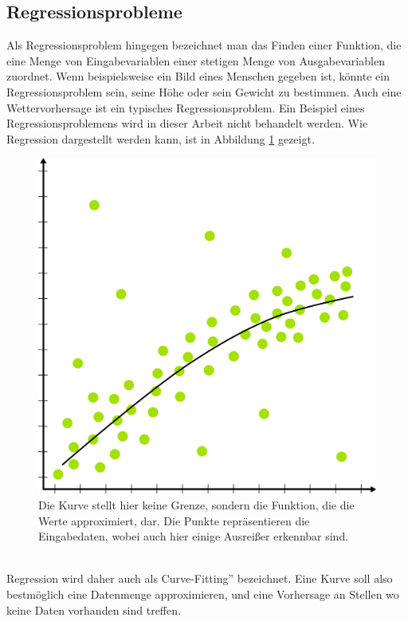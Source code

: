 \documentclass[11pt]{article}
\begin{document}
\subsection{Regressionsprobleme}
Als Regressionsproblem hingegen bezeichnet man das Finden einer Funktion, die eine Menge von Eingabevariablen einer stetigen Menge von Ausgabevariablen zuordnet. Wenn beispielsweise ein Bild eines Menschen gegeben ist, könnte ein Regressionsproblem sein, seine Höhe oder sein Gewicht zu bestimmen. Auch eine Wettervorhersage ist ein typisches Regressionsproblem. Ein Beispiel eines Regressionsproblemens wird in dieser Arbeit nicht behandelt werden. Wie Regression dargestellt werden kann, ist in Abbildung \ref{Regression} gezeigt.
\begin{figure}[h]
	\centering
	\includegraphics[width=0.5\linewidth]{../graphics/Regression.png}
	\caption{Die Kurve stellt hier keine Grenze, sondern die Funktion, die die Werte approximiert, dar. Die Punkte repräsentieren die Eingabedaten, wobei auch hier einige Ausreißer erkennbar sind.}
	\label{Regression}
\end{figure}
\\
Regression wird daher auch als \glqq Curve-Fitting'' bezeichnet. Eine Kurve soll also bestmöglich eine Datenmenge approximieren, und eine Vorhersage an Stellen wo keine Daten vorhanden sind treffen.
\end{document}
